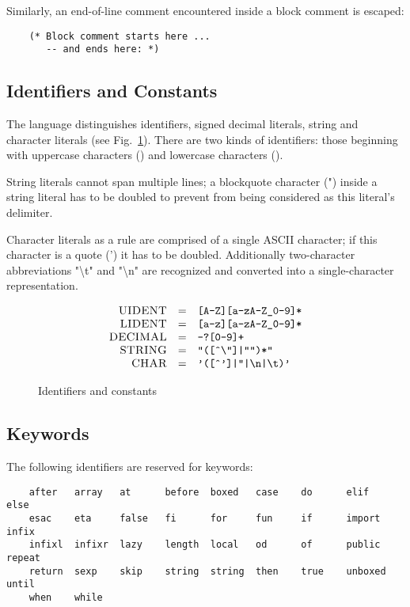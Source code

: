 Similarly, an end-of-line comment encountered inside a block comment is escaped:

\begin{lstlisting}
    (* Block comment starts here ...
       -- and ends here: *)
\end{lstlisting}

\subsection{Identifiers and Constants}

The language distinguishes identifiers, signed decimal literals, string and character literals (see Fig.~\ref{idents_and_consts}). There are
two kinds of identifiers: those beginning with uppercase characters () and lowercase characters ().

String literals cannot span multiple lines; a blockquote character (") inside a string literal has to be doubled to prevent from
being considered as this literal's delimiter.

Character literals as a rule are comprised of a single \textsc{ASCII} character; if this character is a quote (') it has to be doubled. Additionally
two-character abbreviations "\textbackslash t" and "\textbackslash n" are recognized and converted into a single-character representation.

\begin{figure}[t]
  \[
  \begin{array}{rcl}
    \textsc{UIDENT} & = &\mbox{\texttt{[A-Z][a-zA-Z\_0-9]*}}\\
    \textsc{LIDENT} & = &\mbox{\texttt{[a-z][a-zA-Z\_0-9]*}}\\
    \textsc{DECIMAL}& = &\mbox{\texttt{-?[0-9]+}}\\
    \textsc{STRING} & = &\mbox{\texttt{"([\^{}\textbackslash"]|"")*"}}\\
    \textsc{CHAR}   & = &\mbox{\texttt{'([\^{}']|''|\textbackslash n|\textbackslash t)'}}
  \end{array}
  \]
  \caption{Identifiers and constants}
  \label{idents_and_consts}
\end{figure}


\subsection{Keywords}

The following identifiers are reserved for keywords:

\begin{lstlisting}
    after   array   at      before  boxed   case    do      elif    else
    esac    eta     false   fi      for     fun     if      import  infix
    infixl  infixr  lazy    length  local   od      of      public  repeat
    return  sexp    skip    string  string  then    true    unboxed until
    when    while
\end{lstlisting}

